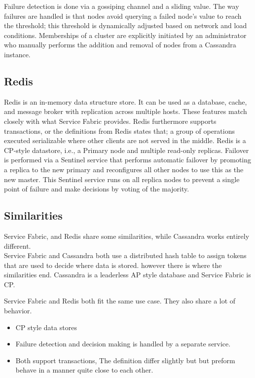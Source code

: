 \documentclass[a4paper,10pt,titlepage]{report}
\begin{document}
Failure detection is done via a gossiping channel and a sliding value. The way failures are handled is that nodes avoid querying a failed node's value to reach the threshold; this threshold is dynamically adjusted based on network and load conditions. Memberships of a cluster are explicitly initiated by an administrator who manually performs the addition and removal of nodes from a Cassandra instance.\cite{Cassandra}
    
    

\subsection{Redis}
Redis is an in-memory data structure store. It can be used as a database, cache, and message broker with replication across multiple hosts. These features match closely with what Service Fabric provides. Redis furthermore supports transactions, or the definitions from Redis states that; a group of operations executed serializable where other clients are not served in the middle. Redis is a CP-style datastore, i.e., a Primary node and multiple read-only replicas. 
Failover is performed via a Sentinel service that performs automatic failover by promoting a replica to the new primary and reconfigures all other nodes to use this as the new master. This Sentinel service runs on all replica nodes to prevent a single point of failure and make decisions by voting of the majority.


\subsection{Similarities}

Service Fabric, and Redis share some similarities, while Cassandra works entirely different. \\ 

Service Fabric and Cassandra both use a distributed hash table to assign tokens that are used to decide where data is stored. however there is where the similarities end. Cassandra is a leaderless AP style database and Service Fabric is CP.

Service Fabric and Redis both fit the same use case. They also share a lot of behavior.
\begin{itemize}
    \item CP style data stores
    \item Failure detection and decision making is handled by a separate service.
    \item Both support transactions, The definition differ slightly but but preform behave in a manner quite close to each other.
\end{itemize}
\end{document}
